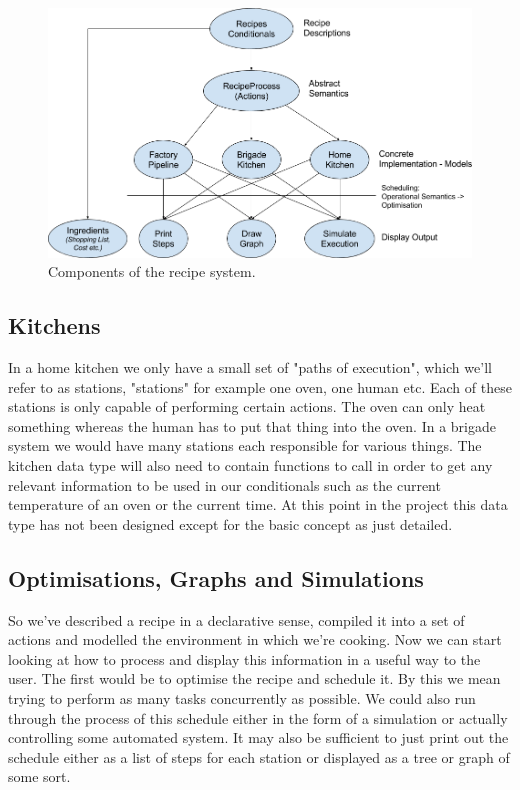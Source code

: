 \documentclass[11pt]{article}
\begin{document}
    \begin{figure}[ht]
        \centering
            \includegraphics[width=\textwidth,keepaspectratio]{recipe_flow.png}
        \caption{Components of the recipe system.}
    \end{figure}

    \subsection{Kitchens}

    In a home kitchen we only have a small set of "paths of execution", which we'll refer to as stations,
    "stations" for example one oven, one human etc. Each of these stations is only capable of performing
    certain actions. The oven can only heat something whereas the human has to put that thing into the oven.
    In a brigade system we would have many stations each responsible for various things. The kitchen data
    type will also need to contain functions to call in order to get any relevant information to be used
    in our conditionals such as the current temperature of an oven or the current time. At this point in
    the project this data type has not been designed except for the basic concept as just detailed.

    \subsection{Optimisations, Graphs and Simulations}

    So we've described a recipe in a declarative sense, compiled it into a set of actions and modelled
    the environment in which we're cooking. Now we can start looking at how to process and display this
    information in a useful way to the user. The first would be to optimise the recipe and schedule it.
    By this we mean trying to perform as many tasks concurrently as possible. We could also run through
    the process of this schedule either in the form of a simulation or actually controlling some automated
    system. It may also be sufficient to just print out the schedule either as a list of steps for each
    station or displayed as a tree or graph of some sort.
\end{document}
